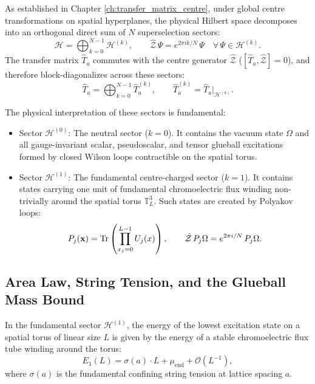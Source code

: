 As established in Chapter \ref{ch:transfer_matrix_centre}, under global centre transformations on spatial hyperplanes, the physical Hilbert space decomposes into an orthogonal direct sum of $N$ superselection sectors:
\begin{equation}
\label{eq:centre_grading_ch8}
\mathcal{H} = \bigoplus_{k=0}^{N-1} \mathcal{H}^{(k)}, \qquad \hat{\mathcal{Z}} \, \Psi = e^{2\pi i k / N} \, \Psi \quad \forall \, \Psi \in \mathcal{H}^{(k)}.
\end{equation}
The transfer matrix $\hat{T}_a$ commutes with the centre generator $\hat{\mathcal{Z}}$ ($[\hat{T}_a, \hat{\mathcal{Z}}] = 0$), and therefore block-diagonalizes across these sectors:
\begin{equation}
\hat{T}_a = \bigoplus_{k=0}^{N-1} \hat{T}_a^{(k)}, \qquad \hat{T}_a^{(k)} = \hat{T}_a|_{\mathcal{H}^{(k)}}.
\end{equation}

The physical interpretation of these sectors is fundamental:
\begin{itemize}
    \item Sector $\mathcal{H}^{(0)}$: The neutral sector ($k = 0$). It contains the vacuum state $\Omega$ and all gauge-invariant scalar, pseudoscalar, and tensor glueball excitations formed by closed Wilson loops contractible on the spatial torus.
    \item Sector $\mathcal{H}^{(1)}$: The fundamental centre-charged sector ($k = 1$). It contains states carrying one unit of fundamental chromoelectric flux winding non-trivially around the spatial torus $\mathbb{T}_L^3$. Such states are created by Polyakov loops:
    \begin{equation}
    \label{eq:polyakov_loop_flux_state}
    P_j(\mathbf{x}) = \mathrm{Tr}\left( \prod_{x_j = 0}^{L-1} U_j(x) \right), \qquad \hat{\mathcal{Z}} \, P_j \Omega = e^{2\pi i / N} \, P_j \Omega.
    \end{equation}
\end{itemize}

\subsection{Area Law, String Tension, and the Glueball Mass Bound}
\label{subsec:string_tension_glueball_bound}

In the fundamental sector $\mathcal{H}^{(1)}$, the energy of the lowest excitation state on a spatial torus of linear size $L$ is given by the energy of a stable chromoelectric flux tube winding around the torus:
\begin{equation}
\label{eq:flux_tube_energy}
E_1(L) = \sigma(a) \cdot L + \mu_{\mathrm{end}} + \mathcal{O}(L^{-1}),
\end{equation}
where $\sigma(a)$ is the fundamental confining string tension at lattice spacing $a$.

